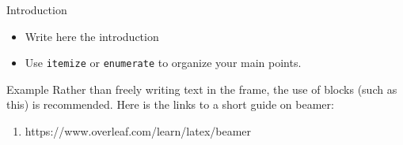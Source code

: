 \documentclass[aspectratio=169]{beamer}
\begin{document}
	\begin{frame}{Introduction}
		
		
		\begin{itemize}
			\item Write here the introduction
			\item Use \texttt{itemize} or \texttt{enumerate} to organize your main points.
		\end{itemize}
				
		\begin{block}{Example}
			Rather than freely writing text in the frame, the use of blocks (such as this) is recommended.
			Here is the links to a short guide on beamer:
			\begin{enumerate}
				\item https://www.overleaf.com/learn/latex/beamer
			\end{enumerate}
		\end{block}
		
	\end{frame}	
	
\end{document}
